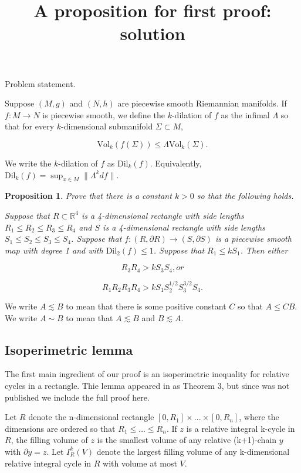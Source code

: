 \documentclass{amsart}
\newtheorem*{theorem 1}{Theorem 1}
\newtheorem*{theorem 2}{Theorem 2}
\newtheorem*{theorem 3}{Theorem 3}
\newtheorem{prop}{Proposition}[section]
\numberwithin{equation}{section}
\newcommand{\Dil}{\textrm{Dil}}
\newcommand{\Vol}{\textrm{Vol}}
\newcommand{\RR}{\mathbb{R}}
\begin{document}
\title{A proposition for first proof: solution}

\maketitle

Problem statement.

Suppose $(M, g)$ and $(N,h)$ are piecewise smooth Riemannian manifolds.   If $f: M \rightarrow N$ is piecewise smooth,  we define the $k$-dilation of $f$ as the infimal $\Lambda$ so that for every $k$-dimensional submanifold $\Sigma \subset M$, 

$$ \Vol_k( f(\Sigma) ) \le \Lambda \Vol_k (\Sigma). $$

\noindent We write the $k$-dilation of $f$ as $\Dil_k(f)$.   Equivalently,  $\Dil_k(f) = \sup_{x \in M} \| \Lambda^k df \|$.

\begin{prop}  Prove that there is a constant $k > 0$ so that the following holds.

Suppose that $R \subset \RR^4$ is a 4-dimensional rectangle with side lengths $R_1 \le R_2 \le R_3 \le R_4$ and $S$ is a 4-dimensional rectangle with side lengths $S_1 \le S_2 \le S_3 \le S_4$.   Suppose that $f: (R, \partial R) \rightarrow (S, \partial S)$ is a piecewise smooth map with degree 1 and with $\Dil_2(f) \le 1$.   Suppose that $R_1 \le k S_1$.   Then either

$$ R_3 R_4 > k S_3 S_4,  or $$

$$ R_1 R_2 R_3 R_4 > k S_1 S_2^{1/2} S_3^{3/2} S_4. $$

\end{prop}




We write $A \lesssim B$ to mean that there is some positive constant $C$ so that $ A \le C B$.  We write $A \sim B$ to mean that $A \lesssim B$ and $B \lesssim A$.  

\subsection{Isoperimetric lemma}

The first main ingredient of our proof is an isoperimetric inequality for relative cycles in a rectangle.   Thie lemma appeared in \cite{G} as Theorem 3,  but since \cite{G} was not published we include the full proof here.

Let $R$ denote the n-dimensional rectangle $[0, R_1] \times ...
\times [0, R_n]$, where the dimensions are ordered so that $R_1
\le ... \le R_n$.    If $z$ is a relative integral k-cycle in $R$, the filling volume
of $z$ is the smallest volume of any relative (k+1)-chain $y$
with $\partial y = z$.  Let $I^k_R(V)$ denote the largest filling
volume of any k-dimensional relative integral cycle in $R$ with
volume at most $V$.
\end{document}
